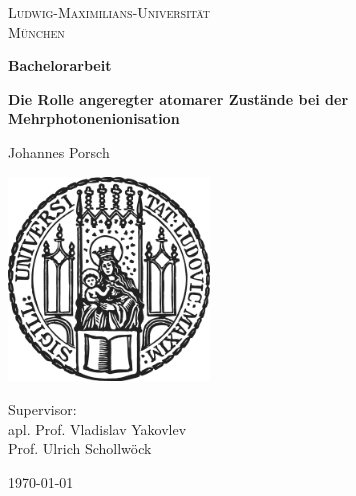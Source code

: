 \begin{titlepage}
    \centering
    
    \begin{center}
        {\Large\textsc{Ludwig-Maximilians-Universität}}\\
        \vspace{0.25cm}
        {\Large\textsc{München}}
    \end{center}

    \vspace{0.5cm}

    
    \vspace{2cm}

    {\Large \bfseries Bachelorarbeit}

    \vspace{0.5cm}
    
    {\huge\bfseries Die Rolle angeregter atomarer Zustände bei der Mehrphotonenionisation\\[0.4cm]}
    
    \vspace{1.5cm}
    
    {\Large Johannes Porsch}
    
    
    \vfill
    
    \includegraphics[width = 0.4\textwidth]{figures/sigillum.png}

     \vfill
    
    Supervisor: \\apl. Prof. Vladislav Yakovlev \\Prof. Ulrich Schollwöck 

    \vfill
    
    {\Large \today}
    
\end{titlepage}